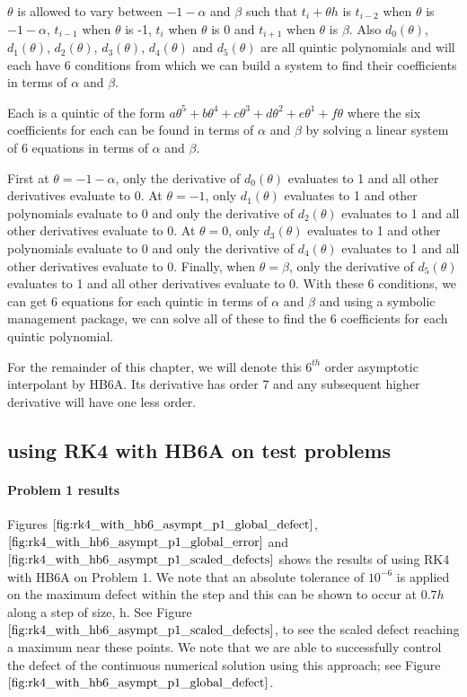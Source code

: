 $\theta$ is allowed to vary between $-1-\alpha$ and $\beta$ such that $t_i + \theta h$ is $t_{i-2}$ when $\theta$ is $-1-\alpha$, $t_{i-1}$ when $\theta$ is -1, $t_i$ when $\theta$ is 0 and $t_{i + 1}$ when $\theta$ is $\beta$. Also $d_0(\theta)$, $d_1(\theta)$, $d_2(\theta)$, $d_3(\theta)$, $d_4(\theta)$ and $d_5(\theta)$ are all quintic polynomials and will each have 6 conditions from which we can build a system to find their coefficients in terms of $\alpha$ and $\beta$.

Each is a quintic of the form $a\theta^5 + b\theta^4 + c\theta^3 + d\theta^2 + e\theta^1 + f\theta$ where the six coefficients for each can be found in terms of $\alpha$ and $\beta$ by solving a linear system of 6 equations in terms of $\alpha$ and $\beta$. 

First at $\theta= -1-\alpha$, only the derivative of $d_0(\theta)$ evaluates to 1 and all other derivatives evaluate to 0. At $\theta=-1$, only $d_1(\theta)$ evaluates to 1 and other polynomials evaluate to 0 and only the derivative of $d_2(\theta)$ evaluates to 1 and all other derivatives evaluate to 0. At $\theta=0$, only $d_3(\theta)$ evaluates to 1 and other polynomials evaluate to 0 and only the derivative of $d_4(\theta)$ evaluates to 1 and all other derivatives evaluate to 0. Finally, when $\theta=\beta$, only the derivative of $d_5(\theta)$ evaluates to 1 and all other derivatives evaluate to 0. With these 6 conditions, we can get 6 equations for each quintic in terms of $\alpha$ and $\beta$ and using a symbolic management package, we can solve all of these to find the 6 coefficients for each quintic polynomial.

For the remainder of this chapter, we will denote this $6^{th}$ order asymptotic interpolant by HB6A. Its derivative has order 7 and any subsequent higher derivative will have one less order.

\subsection{using RK4 with HB6A on test problems}

\paragraph{Problem 1 results}
Figures $\ref{fig:rk4_with_hb6_asympt_p1_global_defect}$, $\ref{fig:rk4_with_hb6_asympt_p1_global_error}$ and $\ref{fig:rk4_with_hb6_asympt_p1_scaled_defects}$ shows the results of using RK4 with HB6A on Problem 1. We note that an absolute tolerance of $10^{-6}$ is applied on the maximum defect within the step and this can be shown to occur at $0.7h$ along a step of size, h. See Figure $\ref{fig:rk4_with_hb6_asympt_p1_scaled_defects}$, to see the scaled defect reaching a maximum near these points. We note that we are able to successfully control the defect of the continuous numerical solution using this approach; see Figure $\ref{fig:rk4_with_hb6_asympt_p1_global_defect}$. 

